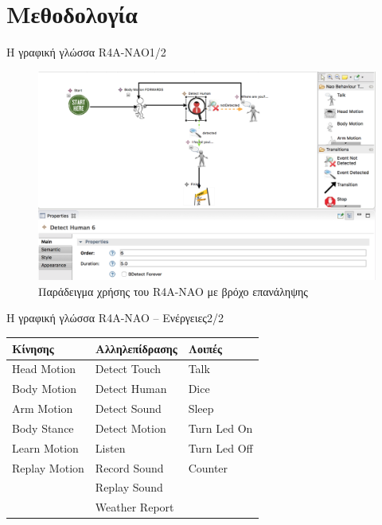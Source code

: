\documentclass{beamer}
\def\textenglish{}
\newcommand{\en}[1]{\textenglish{#1}}
\newcommand{\metamodel}{\en{R4A-NAO}}
\begin{document}
\section{Μεθοδολογία}
\begin{frame}{Η γραφική γλώσσα \metamodel{}\hfill{}1/2}
    \begin{figure}
        \includegraphics[width=\textwidth]{4-loop.png}
        \caption{Παράδειγμα χρήσης του \metamodel{} με βρόχο επανάληψης}
    \end{figure}
\end{frame}
{
\begin{frame}{Η γραφική γλώσσα \metamodel{} -- Ενέργειες\hfill{}2/2}
    \begin{table}
        \begin{tabular}{lll}
            \toprule
            Κίνησης       & Αλληλεπίδρασης & Λοιπές       \\
            \midrule
            Head Motion   & Detect Touch   & Talk         \\
            Body Motion   & Detect Human   & Dice         \\
            Arm Motion    & Detect Sound   & Sleep        \\
            Body Stance   & Detect Motion  & Turn Led On  \\
            Learn Motion  & Listen         & Turn Led Off \\
            Replay Motion & Record Sound   & Counter      \\
                          & Replay Sound   &              \\
                          & Weather Report &              \\
        \end{tabular}
    \end{table}
\end{frame}
}
\end{document}

